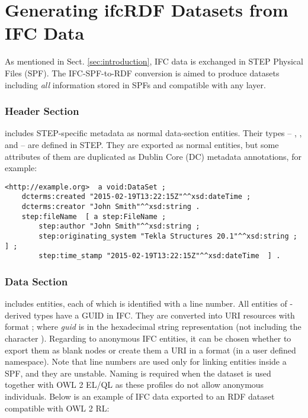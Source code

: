 
\section{Generating ifcRDF Datasets from IFC Data}
\label{sec:ifcRDF}

As mentioned in Sect. \ref{sec:introduction}, IFC data is exchanged in STEP Physical Files (SPF). The IFC-SPF-to-RDF conversion is aimed to produce \ifcrdf{} datasets including \emph{all} information stored in SPFs and compatible with any \ifcowl{} layer.

\subsubsection{Header Section} includes STEP-specific metadata as normal data-section entities. Their types -- , , and  -- are defined in STEP. They are exported as normal entities, but some attributes of them are duplicated as Dublin Core (DC) metadata annotations, for example:

\begin{lstlisting}
<http://example.org>  a void:DataSet ;
    dcterms:created "2015-02-19T13:22:15Z"^^xsd:dateTime ;
    dcterms:creator "John Smith"^^xsd:string .
    step:fileName  [ a step:FileName ;
        step:author "John Smith"^^xsd:string ;
        step:originating_system "Tekla Structures 20.1"^^xsd:string ; ] ;
        step:time_stamp "2015-02-19T13:22:15Z"^^xsd:dateTime  ] .
\end{lstlisting}


\subsubsection{Data Section} includes entities, each of which is identified with a line number.
All entities of -derived types have a GUID in IFC. They are converted into URI resources with format ; where \emph{guid} is in the hexadecimal string representation (not including the character \name{\$}). Regarding to anonymous IFC entities, it can be chosen whether to export them as blank nodes or create them a URI in a format  (in a user defined namespace). Note that line numbers are used only for linking entities inside a SPF, and they are unstable. Naming is required when the dataset is used together with OWL 2 EL/QL as these profiles do not allow anonymous individuals. Below is an example of IFC data exported to an RDF dataset compatible with OWL 2 RL:

